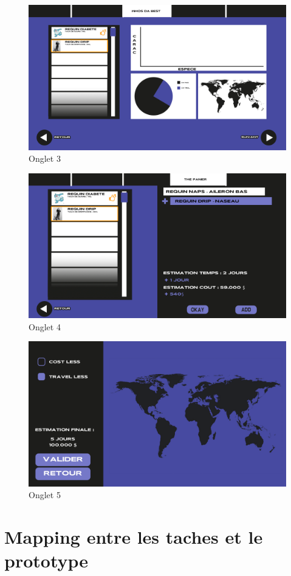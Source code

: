 \documentclass{article}
\begin{document}
\begin{figure}[!h]
	\centering
	\includegraphics[width=14.4cm]{assets/prototype/basse/onglet3}
	\caption{\label{assets/prototype/basse/onglet3} Onglet 3}
\end{figure}

\vspace{1cm}

\begin{figure}[!h]
	\centering
	\includegraphics[width=14.4cm]{assets/prototype/basse/onglet4}
	\caption{\label{assets/prototype/basse/onglet4} Onglet 4}
\end{figure}

\begin{figure}[!h]
	\centering
	\includegraphics[width=14.4cm]{assets/prototype/basse/onglet5}
	\caption{\label{assets/prototype/basse/onglet5} Onglet 5}
\end{figure}

\clearpage
\section{Mapping entre les taches et le prototype}
\end{document}
